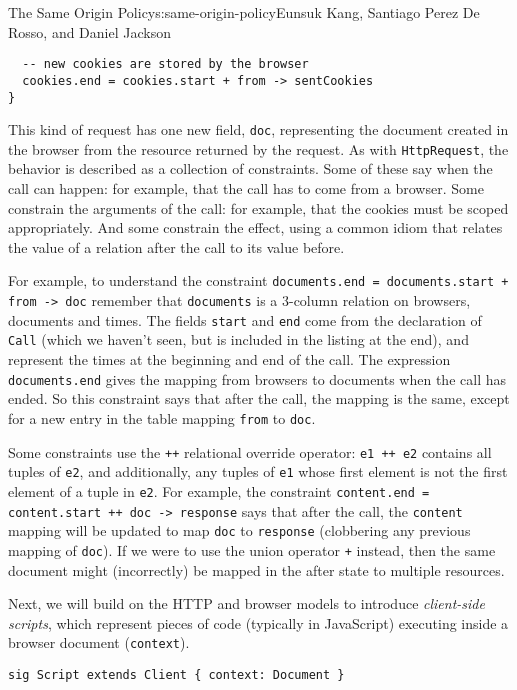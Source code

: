 \begin{aosachapter}{The Same Origin Policy}{s:same-origin-policy}{Eunsuk Kang, Santiago Perez De Rosso, and Daniel Jackson}
\begin{verbatim}
  -- new cookies are stored by the browser
  cookies.end = cookies.start + from -> sentCookies
}
\end{verbatim}

This kind of request has one new field, \texttt{doc}, representing the
document created in the browser from the resource returned by the
request. As with \texttt{HttpRequest}, the behavior is described as a
collection of constraints. Some of these say when the call can happen:
for example, that the call has to come from a browser. Some constrain
the arguments of the call: for example, that the cookies must be scoped
appropriately. And some constrain the effect, using a common idiom that
relates the value of a relation after the call to its value before.

For example, to understand the constraint
\texttt{documents.end = documents.start + from -\textgreater{} doc}
remember that \texttt{documents} is a 3-column relation on browsers,
documents and times. The fields \texttt{start} and \texttt{end} come
from the declaration of \texttt{Call} (which we haven't seen, but is
included in the listing at the end), and represent the times at the
beginning and end of the call. The expression \texttt{documents.end}
gives the mapping from browsers to documents when the call has ended. So
this constraint says that after the call, the mapping is the same,
except for a new entry in the table mapping \texttt{from} to
\texttt{doc}.

Some constraints use the \texttt{++} relational override operator:
\texttt{e1 ++ e2} contains all tuples of \texttt{e2}, and additionally,
any tuples of \texttt{e1} whose first element is not the first element
of a tuple in \texttt{e2}. For example, the constraint
\texttt{content.end = content.start ++ doc -\textgreater{} response}
says that after the call, the \texttt{content} mapping will be updated
to map \texttt{doc} to \texttt{response} (clobbering any previous
mapping of \texttt{doc}). If we were to use the union operator
\texttt{+} instead, then the same document might (incorrectly) be mapped
in the after state to multiple resources.

\label{script}

Next, we will build on the HTTP and browser models to introduce
\emph{client-side scripts}, which represent pieces of code (typically in
JavaScript) executing inside a browser document (\texttt{context}).

\begin{verbatim}
sig Script extends Client { context: Document }
\end{verbatim}


\end{aosachapter}
